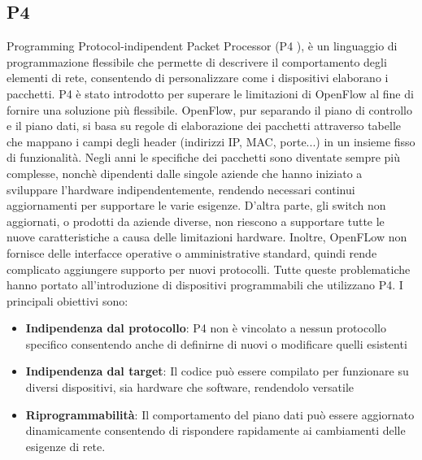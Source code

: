 \subsection{P4}
Programming Protocol-indipendent Packet Processor (P4 \cite{p4}), è un linguaggio di programmazione flessibile
che permette di descrivere il comportamento degli elementi di rete, consentendo di personalizzare come i dispositivi elaborano i pacchetti.
P4 è stato introdotto per superare le limitazioni di OpenFlow al fine di fornire una soluzione più flessibile.
\newline OpenFlow, pur separando il piano di controllo e il piano dati, si basa su regole di elaborazione dei pacchetti attraverso tabelle che mappano i campi degli header (indirizzi IP, MAC, porte...) in un insieme fisso di funzionalità.
\newline Negli anni le specifiche dei pacchetti sono diventate sempre più complesse, nonchè dipendenti dalle singole aziende che hanno iniziato a sviluppare l'hardware indipendentemente, rendendo necessari continui aggiornamenti per supportare le varie esigenze\cite{p4art}.
D'altra parte, gli switch non aggiornati, o prodotti da aziende diverse, non riescono a supportare tutte le nuove caratteristiche a causa delle limitazioni hardware.
\newline Inoltre, OpenFLow non fornisce delle interfacce operative o amministrative standard, quindi rende complicato aggiungere supporto per nuovi protocolli.
Tutte queste problematiche hanno portato all'introduzione di dispositivi programmabili che utilizzano P4.
\newline I principali obiettivi sono:
\begin{itemize}
    \item \textbf{Indipendenza dal protocollo}: P4 non è vincolato a nessun protocollo specifico consentendo anche di definirne di nuovi o modificare quelli esistenti
    \item \textbf{Indipendenza dal target}: Il codice può essere compilato per funzionare su diversi dispositivi, sia hardware che software, rendendolo versatile
    \item \textbf{Riprogrammabilità}: Il comportamento del piano dati può essere aggiornato dinamicamente consentendo di rispondere rapidamente ai cambiamenti delle esigenze di rete.
\end{itemize}
